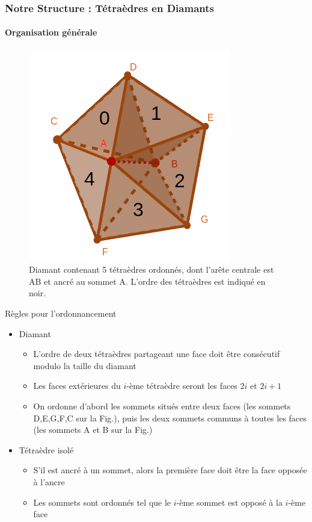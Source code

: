 \documentclass[9pt]{beamer}
\begin{document}
\begin{frame}
\small
\frametitle{Notre Structure : Tétraèdres en Diamants}
\framesubtitle{Organisation générale}
\begin{figure}[H]
\centering
\includegraphics[scale=0.22]{Images/tetra_ordonnee}
\caption{Diamant contenant 5 tétraèdres ordonnés, dont l'arête centrale est AB et ancré au sommet A. L'ordre des tétraèdres est indiqué en noir.}
\end{figure}
\begin{block}{Règles pour l'ordonnancement}
\begin{itemize}
\item Diamant
\begin{itemize}
\item L'ordre de deux tétraèdres partageant une face doit être consécutif modulo la taille du diamant
\item Les faces extérieures du $i$-ème tétraèdre seront les faces $2i$ et $2i+1$
\item On ordonne d'abord les sommets situés entre deux faces (les sommets D,E,G,F,C sur la Fig.), puis les deux sommets communs à toutes les faces (les sommets A et B sur la Fig.)
\end{itemize}
\item Tétraèdre isolé
\begin{itemize}
\item S'il est ancré à un sommet, alors la première face doit être la face opposée à l'ancre
\item Les sommets sont ordonnés tel que le $i$-ème sommet est opposé à la $i$-ème face
\end{itemize}
\end{itemize}
\end{block}
\end{frame}
\end{document}
